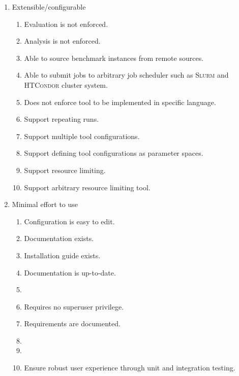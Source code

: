 \begin{enumerate}[noitemsep]
    \item Extensible/configurable
    \begin{enumerate}[noitemsep]
        \item Evaluation is not enforced.
        \item Analysis is not enforced.
        \item Able to source benchmark instances from remote sources.
        \item Able to submit jobs to arbitrary job scheduler such as \textsc{Slurm} and \textsc{HTCondor} cluster system.
        \item Does not enforce tool to be implemented in specific language.
        \item Support repeating runs.
        \item Support multiple tool configurations.
        \item Support defining tool configurations as parameter spaces.
        \item Support resource limiting.
        \item Support arbitrary resource limiting tool.
    \end{enumerate}

    \item Minimal effort to use
    \begin{enumerate}[noitemsep]
        \item Configuration is easy to edit.
        \item Documentation exists.
        \item Installation guide exists.
        \item Documentation is up-to-date.
        \item {}
        \item Requires no superuser privilege.
        \item Requirements are documented.
        \item {}
        \item {}
        \item Ensure robust user experience through unit and integration testing.
    \end{enumerate}


\end{enumerate}
